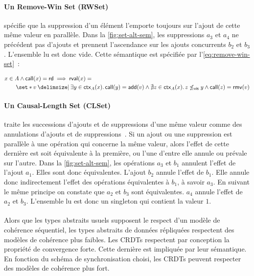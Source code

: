 \paragraph{Un Remove-Win Set (RWSet)} spécifie que la suppression d'un élément l'emporte toujours sur l'ajout de cette même valeur en parallèle.
Dans la \autoref{fig:set-alt-sem}, les suppressions $a_3$ et $a_4$ ne précédent pas d'ajouts et prennent l'ascendance sur les ajouts concurrents $b_2$ et $b_3$.
L'ensemble lu est donc vide.
Cette sémantique est spécifiée par l'\autoref{eq:remove-win-set}~:

\begin{equation}\begin{split}\label{eq:remove-win-set}
\MoveEqLeft x \in A \land \trm{call}(x) = \trm{rd} \implies \trm{rval}(x) =\\
    &\set*{v \given \exists y \in \trm{ctx}_A(x) \qsep \trm{call}(y) = \trm{add}(v) \land \nexists z \in \trm{ctx}_A(x) \qsep z \not\viseq y \land \trm{call}(z) = \trm{rmv}(v)}
\end{split}\end{equation}

\paragraph{Un Causal-Length Set (CLSet)~\autocite{yu2020_clset}} traite les successions d'ajouts et de suppressions d'une même valeur comme des annulations d'ajouts et de suppressions~\autocite{2019_yu_genericundo}.
Si un ajout ou une suppression est parallèle à une opération qui concerne la même valeur, alors l'effet de cette dernière est soit équivalente à la première, ou l'une d'entre elle annule ou prévale sur l'autre.
Dans la \autoref{fig:set-alt-sem}, les opérations $a_3$ et $b_1$ annulent l'effet de l'ajout $a_1$.
Elles sont donc équivalentes.
L'ajout $b_2$ annule l'effet de $b_1$.
Elle annule donc indirectement l'effet des opérations équivalentes à $b_1$, à savoir $a_3$.
En suivant le même principe on constate que $a_2$ et $b_3$ sont équivalentes.
$a_4$ annule l'effet de $a_2$ et $b_3$.
L'ensemble lu est donc un singleton qui contient la valeur $1$.

\paragraph{} Alors que les types abstraits usuels supposent le respect d'un modèle de cohérence séquentiel, les types abstraits de données répliquées respectent des modèles de cohérence plus faibles.
Les \acp{CRDT} respectent par conception la propriété de convergence forte.
Cette dernière est impliquée par leur sémantique.
En fonction du schéma de synchronisation choisi, les \acp{CRDT} peuvent respecter des modèles de cohérence plus fort.

